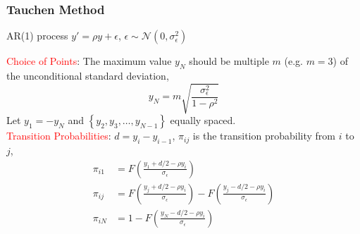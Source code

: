 \documentclass[aspectratio=169, 11pt]{beamer}
\begin{document}
\begin{frame}
\frametitle{Tauchen Method}
  AR(1) process $y'=\rho y+\epsilon $, $\epsilon \sim \mathcal{N}\left(0,\sigma^2_{\epsilon}\right)$ \\
  \bigskip

  \textcolor{red}{Choice of Points}: The maximum value $y_{N}$ should be multiple $m$ (e.g. $m=3$) of the unconditional standard deviation,
  \[
    y_{N}=m\sqrt{\frac{\sigma_{\epsilon}^{2}}{1-\rho^{2}}}
  \]
  Let $y_{1}=-y_{N}$ and $\left\{ y_{2},y_{3},\ldots,y_{N-1}\right\}$ equally spaced. \\
  \bigskip
  \textcolor{red}{Transition Probabilities}: $d=y_{i}-y_{i-1}$, $\pi_{ij}$ is the transition probability from $i$ to $j$,
  \begin{align*}
    \pi_{i1} & =F\left(\frac{y_{1}+d/2-\rho y_{i}}{\sigma_{\epsilon}}\right)\\
    \pi_{ij} & =F\left(\frac{y_{j}+d/2-\rho y_{i}}{\sigma_{\epsilon}}\right)-F\left(\frac{y_{j}-d/2-\rho y_{i}}{\sigma_{\epsilon}}\right)\\
    \pi_{iN} & =1-F\left(\frac{y_{N}-d/2-\rho y_{i}}{\sigma_{\epsilon}}\right)
  \end{align*}

\end{frame}
\end{document}
